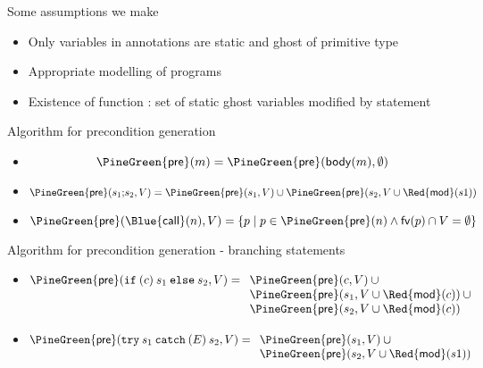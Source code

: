 \documentclass[final,nocolorBG,a4,marieke,nototal,pdf, accumulate,slideColor]{prosper}
\begin{document}
\begin{slide}{Some assumptions we make}
\begin{itemize}
  \item Only variables in annotations are static and ghost of primitive type
  \item Appropriate modelling of programs
  \item Existence of function {\large\textsf{}}: set of static ghost
variables modified by statement 
\end{itemize}
\end{slide}

\begin{slide}{Algorithm for precondition generation}
\begin{itemize}
   \item {}
\[\mathsf{\PineGreen{pre}}(m)  =  \mathsf{\PineGreen{pre}}(\mathsf{body}(m), \emptyset)\]
   \item {}
\[\mathsf{\PineGreen{pre}}(s_1 \mathtt{;} s_2, V)  =  \mathsf{\PineGreen{pre}}(s_1, V) \cup 
                                          \mathsf{\PineGreen{pre}}(s_2, V \cup
\mathsf{\Red{mod}}(s1))\]
   \item {}
\[\mathsf{\PineGreen{pre}}(\mathsf{\Blue{call}}(n),V)  =  
                \{ p \mid p \in \mathsf{\PineGreen{pre}}(n) \wedge 
                          \mathsf{fv}(p) \cap V = \emptyset\}\]
\end{itemize}
\end{slide}

\begin{slide}{Algorithm for precondition generation - branching statements}
\begin{itemize}
   \item {}
\[
\mathsf{\PineGreen{pre}}(\mathtt{if\:(} c \mathtt{)\:} s_1 \mathtt{\:else\:} s_2,
V)  = 
\begin{array}[t]{l}
   \mathsf{\PineGreen{pre}}(c, V) \:\cup \\
   \mathsf{\PineGreen{pre}}(s_1, V \cup \mathsf{\Red{mod}}(c)) \:\cup\\
   \mathsf{\PineGreen{pre}}(s_2, V \cup \mathsf{\Red{mod}}(c))
\end{array}\]
\item {}
\[\mathsf{\PineGreen{pre}}(\mathtt{try\:} s_1 \mathtt{\:catch\:(} E \mathtt{)\:} s_2, V)  =  \begin{array}[t]{l}
   \mathsf{\PineGreen{pre}}(s_1, V) \:\cup \\
   \mathsf{\PineGreen{pre}}(s_2, V \cup \mathsf{\Red{mod}}(s1))
  \end{array}\]
\end{itemize}
\end{slide}
\end{document}

